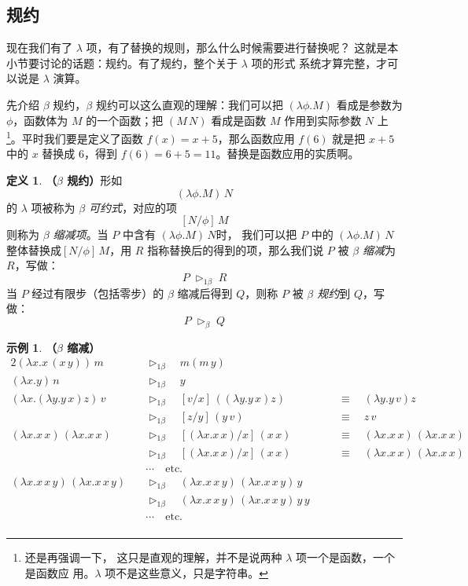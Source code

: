 \documentclass[a4paper,adobefonts]{ctexart}
\theoremstyle{definition}
\newtheorem{definition}{定义}
\newtheorem{example}{示例}
\begin{document}
\subsection{规约}

现在我们有了 $\lambda$ 项，有了替换的规则，那么什么时候需要进行替换呢？
这就是本小节要讨论的话题：规约。有了规约，整个关于 $\lambda$ 项的形式
系统才算完整，才可以说是 $\lambda$ 演算。

先介绍 $\beta$ 规约，$\beta$ 规约可以这么直观的理解：我们可以把
$(\lambda\phi.M)$ 看成是参数为 $\phi$，函数体为 $M$ 的一个函数；把
$(M\,N)$ 看成是函数 $M$ 作用到实际参数 $N$ 上\footnote{还是再强调一下，
  这只是直观的理解，并不是说两种 $\lambda$ 项一个是函数，一个是函数应
  用。$\lambda$ 项不是这些意义，只是字符串。}。平时我们要是定义了函数
$f(x)=x+5$，那么函数应用 $f(6)$ 就是把 $x+5$ 中的 $x$ 替换成 6，得到
$f(6)=6+5=11$。替换是函数应用的实质啊。

\begin{definition}{\bfseries{（$\beta$ 规约）}}\label{def:betareduce}
  形如
  $$
  (\lambda\phi.M)\,N
  $$
  的 $\lambda$ 项被称为 \emph{$\beta$ 可约式}，对应的项
  $$
  [N/\phi]\,M
  $$则称为 \emph{$\beta$ 缩减项}。当 $P$ 中含有 $(\lambda\phi.M)\,N$时，
  我们可以把 $P$ 中的 $(\lambda\phi.M)\,N$ 整体替换成$[N/\phi]\,M$，用
  $R$ 指称替换后的得到的项，那么我们说 $P$ 被 \emph{$\beta$ 缩减}为
  $R$，写做：
  $$
  P\;\triangleright_{1\beta}\;R
  $$当 $P$ 经过有限步（包括零步）的 $\beta$ 缩减后得到 $Q$，则称 $P$
  被 \emph{$\beta$ 规约}到 $Q$，写做：
  $$
  P\;\triangleright_\beta\;Q
  $$
\end{definition}

\newcommand{\betac}{\triangleright_{1\beta}}
\newcommand{\betar}{\triangleright_\beta}
\newcommand{\betae}{=_\beta}

\begin{example}{\bfseries{（$\beta$ 缩减）}}\label{example:beta}
  \begin{alignat*}{2}
    (\lambda x.x\,(x\,y))\,m \quad &\betac\quad  m(m\,y) \\
    (\lambda x.y)\,n \quad &\betac\quad y \\
    (\lambda x.(\lambda y.y\,x)z)\,v\quad &\betac\quad [v/x]\,((\lambda y.y\,x)z) & &\equiv\quad (\lambda y.y\,v)z\\
    &\betac\quad [z/y]\,(y\,v)&\quad &\equiv\quad z\,v \\
    (\lambda x.x\,x)\,(\lambda x.x\,x)\quad &\betac\quad [(\lambda x.x\,x)/x]\,(x\,x) & &\equiv\quad (\lambda x.x\,x)\,(\lambda x.x\,x)\\
    &\betac\quad [(\lambda x.x\,x)/x]\,(x\,x) & &\equiv\quad (\lambda x.x\,x)\,(\lambda x.x\,x)\\
    &\cdots\quad \text{etc.}\\
    (\lambda x.x\,x\,y)\,(\lambda x.x\,x\,y)\quad 
    &\betac\quad (\lambda x.x\,x\,y)\,(\lambda x.x\,x\,y)\,y\\
    &\betac\quad (\lambda x.x\,x\,y)\,(\lambda x.x\,x\,y)\,y\,y \\
    &\cdots\quad \text{etc.} \\
  \end{alignat*}
\end{example}
\end{document}
